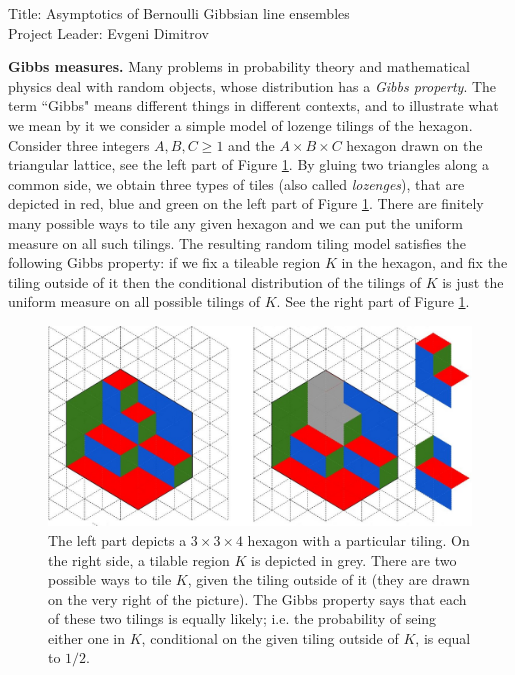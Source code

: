 \documentclass[a4paper, 11pt]{amsart}
\newcounter{theo}[section]\setcounter{theo}{0}
\begin{document}
\begin{center}
\Large Title: Asymptotics of Bernoulli Gibbsian line ensembles\\
\Large Project Leader: Evgeni Dimitrov
\end{center}

\vspace{15mm}

{\raggedleft \bf Gibbs measures.} Many problems in probability theory and mathematical physics deal with random objects, whose distribution has a {\em Gibbs property}. The term ``Gibbs" means different things in different contexts, and to illustrate what we mean by it we consider a simple model of lozenge tilings of the hexagon. Consider three integers $A, B, C\geq 1$ and the $A \times B \times C$ hexagon drawn on the triangular lattice, see the left part of Figure \ref{S1_1}. By gluing two triangles along a common side, we obtain three types of tiles (also called {\em lozenges}), that are depicted in red, blue and green on the left part of Figure \ref{S1_1}. There are finitely many possible ways to tile any given hexagon and we can put the uniform measure on all such tilings. The resulting random tiling model satisfies the following Gibbs property: if we fix a tileable region $K$ in the hexagon, and fix the tiling outside of it then the conditional distribution of the tilings of $K$ is just the uniform measure on all possible tilings of $K$. See the right part of Figure \ref{S1_1}.
\begin{figure}[h]
\begin{center}
  \includegraphics[scale = 0.40]{S_2.jpg}
  \vspace{-2mm}
  \caption{ The left part depicts a $3 \times 3 \times 4$ hexagon with a particular tiling. On the right side, a tilable region $K$ is depicted in grey. There are two possible ways to tile $K$, given the tiling outside of it (they are drawn on the very right of the picture). The Gibbs property says that each of these two tilings is equally likely; i.e. the probability of seing either one in $K$, conditional on the given tiling outside of $K$, is equal to $1/2$. }
  \label{S1_1}
  \end{center}
\end{figure}
\end{document}

